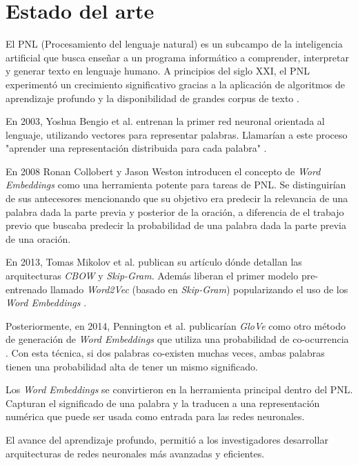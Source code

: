 
\section{Estado del arte}

El PNL (Procesamiento del lenguaje natural) es un subcampo de la inteligencia artificial que busca enseñar a un programa informático a comprender, interpretar y generar texto en lenguaje humano. A principios del siglo XXI, el PNL experimentó un crecimiento significativo gracias a la aplicación de algoritmos de aprendizaje profundo y la disponibilidad de grandes corpus de texto \citep{WEBSITE:14}. 

En 2003, Yoshua Bengio et al. entrenan la primer red neuronal orientada al lenguaje, utilizando vectores para representar palabras. Llamarían a este proceso "aprender una representación distribuida para cada palabra" \citep{ARTICLE:1}.

En 2008 Ronan Collobert y Jason Weston introducen el concepto de \textit{Word Embeddings} como una herramienta potente para tareas de PNL. Se distinguirían de sus antecesores mencionando que su objetivo era predecir la relevancia de una palabra dada la parte previa y posterior de la oración, a diferencia de el trabajo previo que buscaba predecir la probabilidad de una palabra dada la parte previa de una oración.

En 2013, Tomas Mikolov et al. publican su artículo dónde detallan las arquitecturas \textit{CBOW} y \textit{Skip-Gram}. Además liberan el primer modelo pre-entrenado llamado \textit{Word2Vec} (basado en \textit{Skip-Gram}) popularizando el uso de los \textit{Word Embeddings} \citep{ARTICLE:3}.

Posteriormente, en 2014, Pennington et al. publicarían \textit{GloVe} como otro método de generación de \textit{Word Embeddings} que utiliza una probabilidad de co-ocurrencia \citep{ARTICLE:4}. Con esta técnica, si dos palabras co-existen muchas veces, ambas palabras tienen una probabilidad alta de tener un mismo significado.

Los \textit{Word Embeddings} se convirtieron en la herramienta principal dentro del PNL. Capturan el significado de una palabra y la traducen a una representación numérica que puede ser usada como entrada para las redes neuronales.

El avance del aprendizaje profundo, permitió a los investigadores desarrollar arquitecturas de redes neuronales más avanzadas y eficientes. 

